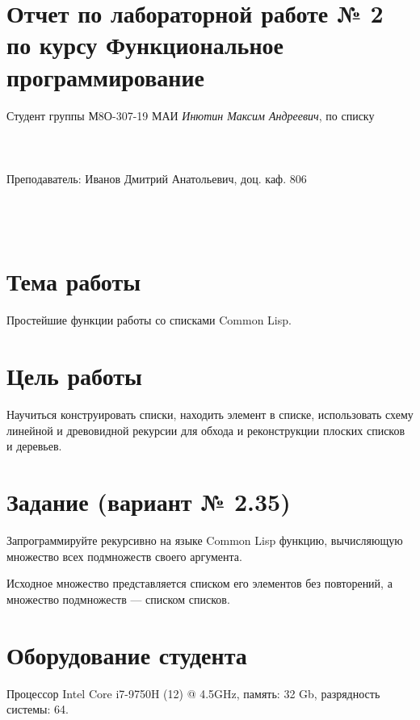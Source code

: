 \documentclass[12pt]{article}
\begin{document}
\section*{Отчет по лабораторной работе № 2 \\
по курсу \guillemotleft Функциональное программирование\guillemotright}
\begin{flushright}
Студент группы М8О-307-19 МАИ \textit{Инютин Максим Андреевич},  по списку \\
 \\
 \\
\ \\
Преподаватель: Иванов Дмитрий Анатольевич, доц. каф. 806 \\
 \\
 \\
 \\

\end{flushright}

\section{Тема работы}
Простейшие функции работы со списками Common Lisp.

\section{Цель работы}
Научиться конструировать списки, находить элемент в списке, использовать схему линейной и древовидной рекурсии для обхода и реконструкции плоских списков и деревьев.

\section{Задание (вариант № 2.35)}
Запрограммируйте рекурсивно на языке Common Lisp функцию, вычисляющую множество всех подмножеств своего аргумента.

Исходное множество представляется списком его элементов без повторений, а множество подмножеств --- списком списков.

\section{Оборудование студента}
Процессор Intel Core i7-9750H (12) @ 4.5GHz, память: 32 Gb, разрядность системы: 64.
\end{document}

